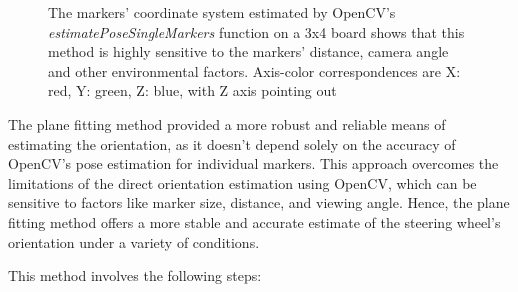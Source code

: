 \begin{figure}[ht]
\begin{subfigure}[t]{0.23\textwidth}
    \end{subfigure}
    \caption{The markers' coordinate system estimated by OpenCV's
            \emph{estimatePoseSingleMarkers} function on a 3x4
            board shows that this method is highly sensitive
            to the markers' distance, camera angle and other
            environmental factors. Axis-color correspondences are 
            X: red, Y: green, Z: blue, with Z axis pointing out}
    \label{fig:estimatePoseSingleMarkers}
\end{figure}

The plane fitting method provided a more robust and reliable 
means of estimating the orientation, as it doesn't depend solely 
on the accuracy of OpenCV's pose estimation for individual 
markers. This approach overcomes the limitations of the direct 
orientation estimation using OpenCV, which can be sensitive to 
factors like marker size, distance, and viewing angle. 
Hence, the plane fitting method offers a more stable and 
accurate estimate of the steering wheel's orientation under a 
variety of conditions.

This method involves the following steps:


